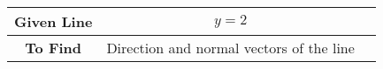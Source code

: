 \begin{tabular}[12pt]{|c|c|c|}
    \hline
    \textbf{Given Line} & $y=2$ \\ 
        \hline
    \textbf{To Find} & Direction and normal vectors of the line \\
    	\hline
\end{tabular}
